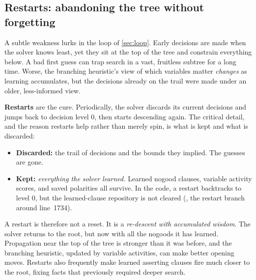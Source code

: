 \subsection{Restarts: abandoning the tree without forgetting}\label{sec:restarts}

A subtle weakness lurks in the loop of \cref{sec:loop}. Early decisions
are made when the solver knows least, yet they sit at the top of the tree and
constrain everything below. A bad first guess can trap search in a vast,
fruitless subtree for a long time. Worse, the branching heuristic's view of which
variables matter \emph{changes} as learning accumulates, but the decisions
already on the trail were made under an older, less-informed view.

\textbf{Restarts} are the cure. Periodically, the solver discards its current
decisions and jumps back to decision level 0, then starts descending again. The
critical detail, and the reason restarts help rather than merely spin, is what
is kept and what is discarded:

\begin{itemize}
  \item \textbf{Discarded:} the trail of decisions and the bounds they implied.
  The guesses are gone.
  \item \textbf{Kept:} \emph{everything the solver learned.} Learned nogood
  clauses, variable activity scores, and saved polarities all survive. In the
  code, a restart backtracks to level 0, but the learned-clause repository is not
  cleared (, the restart branch around
  line~1734).
\end{itemize}

A restart is therefore not a reset. It is a \emph{re-descent with accumulated
wisdom}. The solver returns to the root, but now with all the nogoods it has
learned. Propagation near the top of the tree is stronger than it was before,
and the branching heuristic, updated by variable activities, can make better
opening moves. Restarts also frequently make learned asserting clauses fire much
closer to the root, fixing facts that previously required deeper search.

